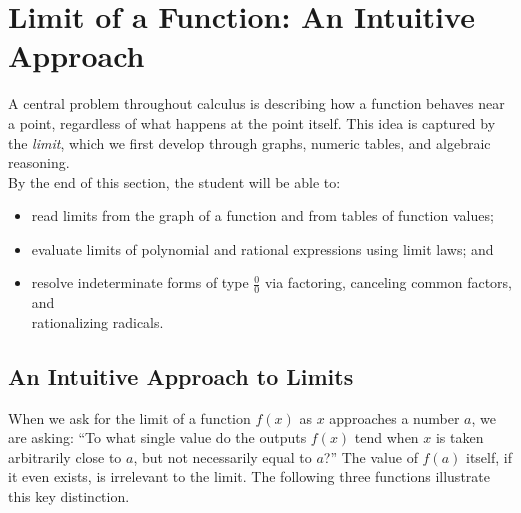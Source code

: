 
\section{Limit of a Function: An Intuitive Approach}
\label{sec:1.1}

A central problem throughout calculus is describing how a function behaves near a point, regardless of what happens at the point itself. This idea is captured by the \emph{limit}, which we first develop through graphs, numeric tables, and algebraic reasoning. \\

By the end of this section, the student will be able to:
\begin{itemize}
    \item read limits from the graph of a function and from tables of function values;
    \item evaluate limits of polynomial and rational expressions using limit laws; and
    \item resolve indeterminate forms of type \(\frac{0}{0}\) via factoring, canceling common factors, and \\ rationalizing radicals.
\end{itemize}


\subsection*{An Intuitive Approach to Limits}
\label{subsec:1.1.1}


When we ask for the limit of a function \(f(x)\) as \(x\) approaches a number \(a\), we are asking: ``To what single value do the outputs \(f(x)\) tend when \(x\) is taken arbitrarily close to \(a\), but not necessarily equal to \(a\)?'' The value of \(f(a)\) itself, if it even exists, is irrelevant to the limit. The following three functions illustrate this key distinction.

